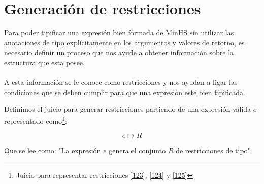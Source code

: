 

\section{Generación de restricciones}

    Para poder tipificar una expresión bien formada de \textsf{MinHS}  sin utilizar las anotaciones de tipo explícitamente en los argumentos y valores de retorno, es necesario definir un proceso que nos ayude a obtener información sobre la estructura que esta posee. \\\\
    A esta información se le conoce como restricciones y nos ayudan a ligar las condiciones que se deben cumplir para que una expresión esté bien tipificada.

    \begin{definition}
        Definimos el juicio para generar restricciones partiendo de una expresión válida $e$ representado como\footnote{Juicio para representar restricciones \hyperlink{123}{[123]},  \hyperlink{124}{[124]} y \hyperlink{125}{[125]}}:
    
        $$e\mapsto R$$
        
        Que se lee como: "La expresión $e$ genera el conjunto $R$ de restricciones de tipo".
    \end{definition}


